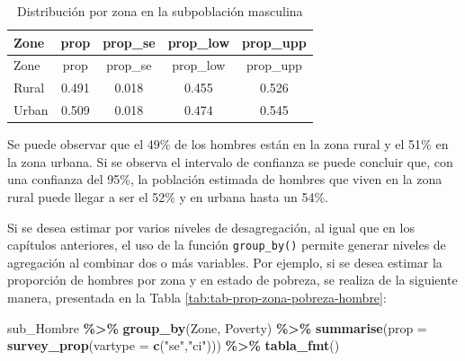 \documentclass[
  spanish,
  12pt,
]{book}
\newenvironment{Shaded}{\begin{snugshade}}{\end{snugshade}}
\newcommand{\AttributeTok}[1]{\textcolor[rgb]{0.13,0.29,0.53}{#1}}
\newcommand{\FunctionTok}[1]{\textcolor[rgb]{0.13,0.29,0.53}{\textbf{#1}}}
\newcommand{\NormalTok}[1]{#1}
\newcommand{\SpecialCharTok}[1]{\textcolor[rgb]{0.81,0.36,0.00}{\textbf{#1}}}
\newcommand{\StringTok}[1]{\textcolor[rgb]{0.31,0.60,0.02}{#1}}
\begin{document}
\begin{longtable}[]{@{}lcccc@{}}
\caption{\label{tab:tab-prop-zona-hombre}Distribución por zona en la subpoblación masculina}\tabularnewline
\toprule\noalign{}
Zone & prop & prop\_se & prop\_low & prop\_upp \\
\midrule\noalign{}
\endfirsthead
\toprule\noalign{}
Zone & prop & prop\_se & prop\_low & prop\_upp \\
\midrule\noalign{}
\endhead
\bottomrule\noalign{}
\endlastfoot
Rural & 0.491 & 0.018 & 0.455 & 0.526 \\
Urban & 0.509 & 0.018 & 0.474 & 0.545 \\
\end{longtable}

Se puede observar que el 49\% de los hombres están en la zona rural y el 51\% en la zona urbana. Si se observa el intervalo de confianza se puede concluir que, con una confianza del 95\%, la población estimada de hombres que viven en la zona rural puede llegar a ser el 52\% y en urbana hasta un 54\%.

Si se desea estimar por varios niveles de desagregación, al igual que en los capítulos anteriores, el uso de la función \texttt{group\_by()} permite generar niveles de agregación al combinar dos o más variables. Por ejemplo, si se desea estimar la proporción de hombres por zona y en estado de pobreza, se realiza de la siguiente manera, presentada en la Tabla \ref{tab:tab-prop-zona-pobreza-hombre}:

\begin{Shaded}
\begin{Highlighting}[]
\NormalTok{sub\_Hombre }\SpecialCharTok{\%\textgreater{}\%}
  \FunctionTok{group\_by}\NormalTok{(Zone, Poverty) }\SpecialCharTok{\%\textgreater{}\%} 
  \FunctionTok{summarise}\NormalTok{(}\AttributeTok{prop =} \FunctionTok{survey\_prop}\NormalTok{(}\AttributeTok{vartype =} \FunctionTok{c}\NormalTok{(}\StringTok{"se"}\NormalTok{,}\StringTok{"ci"}\NormalTok{))) }\SpecialCharTok{\%\textgreater{}\%}
  \FunctionTok{tabla\_fmt}\NormalTok{()}
\end{Highlighting}
\end{Shaded}
\end{document}
